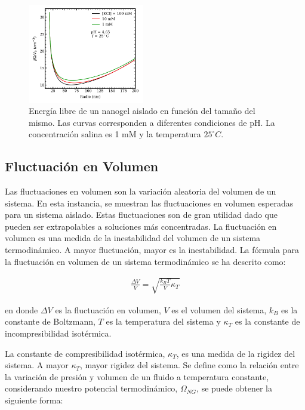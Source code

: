 	
	
	
	\begin{figure}[!htb]
		\centering
		\includegraphics[width=0.45\textwidth]{Figures/graph-mc/interna.png}
		\caption{Energ\'ia libre de un nanogel aislado en funci\'on del tama\~no del mismo. Las curvas corresponden a diferentes condiciones de pH. La concentraci\'on salina es 1 mM y la temperatura $25 ^\circ C$.}
		\label{fig:mc:energy-intra}
	\end{figure}
	
	
	
	
	\subsection{Fluctuaci\'on en Volumen}\label{sec:mc:fluctuacion}
	
	Las fluctuaciones en volumen son la variaci\'on aleatoria del volumen de un sistema. En esta instancia, se muestran las fluctuaciones en volumen esperadas para un sistema aislado. Estas fluctuaciones son de gran utilidad dado que pueden ser extrapolables a soluciones m\'as concentradas.
	La fluctuaci\'on en volumen es una medida de la inestabilidad del volumen de un sistema termodin\'amico. A mayor fluctuaci\'on, mayor es la inestabilidad.
	La f\'ormula para la fluctuaci\'on en volumen de un sistema termodin\'amico se ha descrito como:
	
	\begin{align}
		\frac{\Delta V}{V} = \sqrt{\frac{k_BT}{V}\kappa_T}
	\end{align}
	
	\noindent en donde $\Delta V$ es la fluctuaci\'on en volumen, $V$ es el volumen del sistema, $k_B$ es la constante de Boltzmann, $T$ es la temperatura del sistema y $\kappa_T$ es la constante de incompresibilidad isot\'ermica. 
	
	La constante de compresibilidad isot\'ermica, $\kappa_T$, es una medida de la rigidez del sistema. A mayor $\kappa_T$, mayor rigidez del sistema.
	Se define como la relación entre la variaci\'on de presi\'on y  volumen de un fluido a temperatura constante, considerando nuestro potencial termodin\'amico, $\Omega_{NG}$, se puede obtener la siguiente forma:
	
